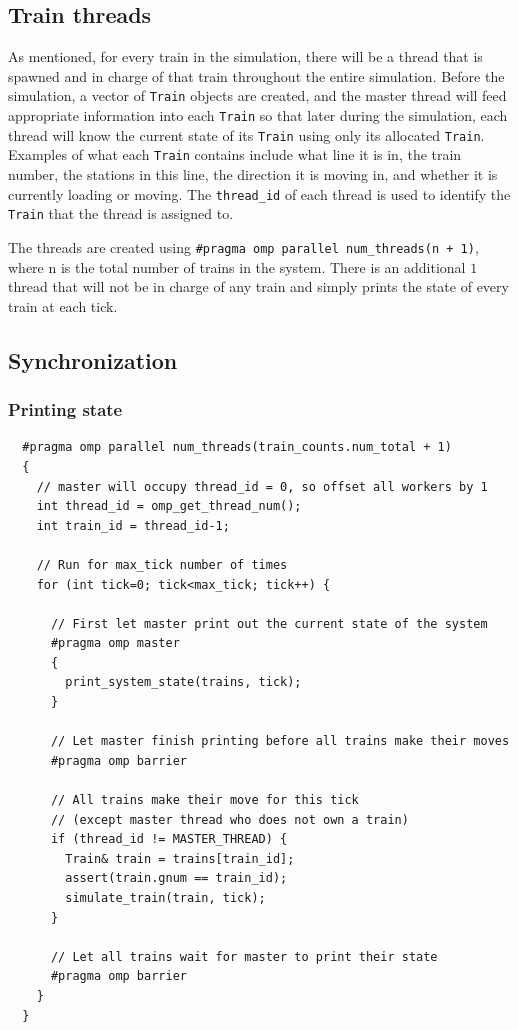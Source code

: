 \documentclass[12pt]{article}
\begin{document}
\subsection{Train threads}

As mentioned, for every train in the simulation, there will be a thread that is spawned and in charge of that train throughout the entire simulation. Before the simulation, a vector of \verb!Train! objects are created, and the master thread will feed appropriate information into each \verb!Train! so that later during the simulation, each thread will know the current state of its \verb!Train! using only its allocated \verb!Train!. Examples of what each \verb!Train! contains include what line it is in, the train number, the stations in this line, the direction it is moving in, and whether it is currently loading or moving. The \verb!thread_id! of each thread is used to identify the \verb!Train! that the thread is assigned to.

\bigbreak \noindent The threads are created using \verb!#pragma omp parallel num_threads(n + 1)!, where n is the total number of trains in the system. There is an additional $1$ thread that will not be in charge of any train and simply prints the state of every train at each tick.

\subsection{Synchronization}

\subsubsection{Printing state}

\begin{verbatim}
  #pragma omp parallel num_threads(train_counts.num_total + 1)
  {
    // master will occupy thread_id = 0, so offset all workers by 1
    int thread_id = omp_get_thread_num();
    int train_id = thread_id-1;

    // Run for max_tick number of times
    for (int tick=0; tick<max_tick; tick++) {

      // First let master print out the current state of the system
      #pragma omp master
      {
        print_system_state(trains, tick);
      }

      // Let master finish printing before all trains make their moves
      #pragma omp barrier

      // All trains make their move for this tick
      // (except master thread who does not own a train)
      if (thread_id != MASTER_THREAD) {
        Train& train = trains[train_id];
        assert(train.gnum == train_id);
        simulate_train(train, tick);
      }

      // Let all trains wait for master to print their state
      #pragma omp barrier
    }
  }
\end{verbatim}
\end{document}
